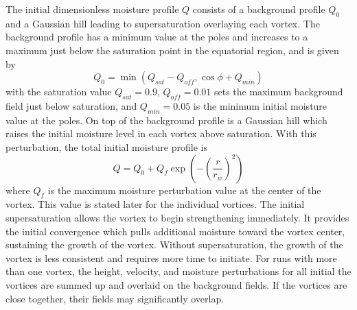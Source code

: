 \documentclass{ametsoc}
\begin{document}
  The initial dimensionless moisture profile $Q$ consists of a background profile $Q_0$ and a 
  Gaussian hill leading to supersaturation overlaying each vortex. 
  The background profile has a minimum value at the poles and increases to a 
  maximum just below the saturation point in the equatorial region, and is given by
   \begin{equation}
    \label{eq:q0} Q_0 = \min(Q_{sat} - Q_{off}, \cos\phi + Q_{min})
  \end{equation}
  with the saturation value $Q_{sat}=0.9$, $Q_{off}= 0.01$ sets the maximum 
  background field just below saturation, and $Q_{min} = 0.05$ is the minimum initial moisture
  value at the poles. On top of the background profile is a Gaussian hill which raises the initial moisture
  level in each vortex above saturation. With this perturbation,
   the total initial moisture profile is
   \begin{equation}
    \label{eq:q} Q = Q_0 + Q_{f}\exp{\left(-\left(\frac{r}
    {r_w}\right)^2\right)}
   \end{equation} 
   where $Q_f$ is the maximum moisture perturbation value at the center of the vortex.
   This value is stated later for the individual vortices.
   The initial supersaturation allows the vortex to begin strengthening immediately. It 
   provides the initial convergence which pulls additional moisture toward the vortex center, sustaining 
   the growth of the vortex.  Without supersaturation, the growth of the vortex is less consistent
   and requires more time to initiate. For runs with more than one vortex, 
   the height, velocity, and moisture perturbations for all initial the vortices are summed up 
   and overlaid on the background fields. If the vortices are close together, 
   their fields may significantly overlap.
   
      
\end{document}
